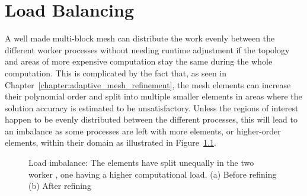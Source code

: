 \chapter{Load Balancing}\label{chapter:load_balancing}

A well made multi-block mesh can distribute the work evenly between the different worker processes
without needing runtime adjustment if the topology and areas of more expensive computation stay the
same during the whole computation. This is complicated by the fact that, as seen in
Chapter~\ref{chapter:adaptive_mesh_refinement}, the mesh elements can increase their polynomial
order and split into multiple smaller elements in areas where the solution accuracy is estimated to
be unsatisfactory. Unless the regions of interest happen to be evenly distributed between the
different processes, this will lead to an imbalance as some processes are left with more elements,
or higher-order elements, within their domain as illustrated in Figure~\ref{fig:load_imbalance_lb}.

\begin{figure}[H]
    \centering
    \hfill
    \caption{Load imbalance: The elements have split unequally in the two worker , one having a higher computational load. (a) Before refining (b) After refining}\label{fig:load_imbalance_lb}
\end{figure}


